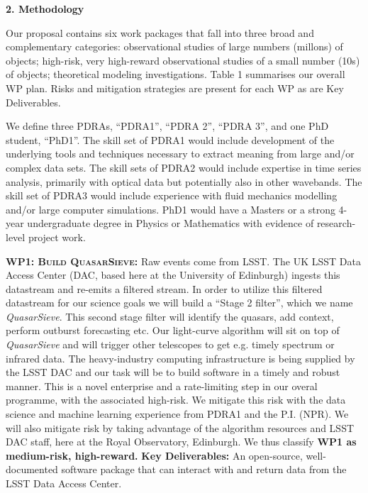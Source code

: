 \documentclass[oneside, a4paper, onecolumn, 11pt]{article}
\begin{document}
\medskip
\medskip
\noindent
\large
{\bf{\textcolor{Cerulean}{2. Methodology}}}
\normalsize

\noindent
Our proposal contains six work packages that fall into three broad
and complementary categories: observational studies of large numbers
(millons) of objects; high-risk, very high-reward observational
studies of a small number (10s) of objects; theoretical modeling
investigations. Table 1 summarises our overall WP plan. Risks and
mitigation strategies are present for each WP as are Key Deliverables.

\smallskip
\smallskip
\noindent
We define three PDRAs, ``PDRA1'', ``PDRA 2'', ``PDRA 3'', and one PhD
student, ``PhD1''.  The skill set of PDRA1 would include development
of the underlying tools and techniques necessary to extract meaning
from large and/or complex data sets.  The skill sets of PDRA2 would
include expertise in time series analysis, primarily with optical
data but potentially also in other wavebands.  The skill set of PDRA3
would include experience with fluid mechanics modelling and/or large
computer simulations.  PhD1 would have a Masters or a strong 4-year
undergraduate degree in Physics or Mathematics with evidence of
research-level project work.


\smallskip
\smallskip
\noindent
\textbf{\textsc{WP1: Build QuasarSieve:}} 
Raw events come from LSST. The UK LSST Data Access Center (DAC, based
here at the University of Edinburgh) ingests this datastream and
re-emits a filtered stream. In order to utilize this filtered
datastream for our science goals we will build a ``Stage 2 filter'',
which we name {\it QuasarSieve}.  This second stage filter will
identify the quasars, add context, perform outburst forecasting etc.
Our light-curve algorithm will sit on top of {\it QuasarSieve} and
will trigger other telescopes to get e.g. timely spectrum or infrared
data.
The heavy-industry computing infrastructure is being supplied by the
LSST DAC and our task will be to build software in a timely and robust
manner.  This is a novel enterprise and a rate-limiting step in our
overal programme, with the associated high-risk.  We mitigate this
risk with the data science and machine learning experience from PDRA1
and the P.I. (NPR).  We will also mitigate risk by taking advantage of
the algorithm resources and LSST DAC staff, here at the Royal
Observatory, Edinburgh.  We thus classify {\bf WP1 as medium-risk,
high-reward.}  {\bf Key Deliverables:} An open-source, well-documented
software package that can interact with and return data from the LSST
Data Access Center.
\end{document}
